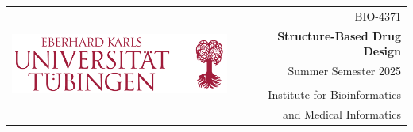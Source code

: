 \selectfont

{
	\small
    \hspace*{-0.3cm}  
    \begin{tabularx}{168mm}{ l X|X r }
        \multirow{7}{*}{\includegraphics[width=9.8cm]{unilogo}} & & & BIO-4371 \\
	    & & & \textcolor{UT_RED}{\textbf{Structure-Based Drug Design}}  \\ [2pt]
        & & & Summer Semester 2025 \\
        & & & \\
        & & & Institute for Bioinformatics \\
        & & & and Medical Informatics \\
    \end{tabularx}
}
